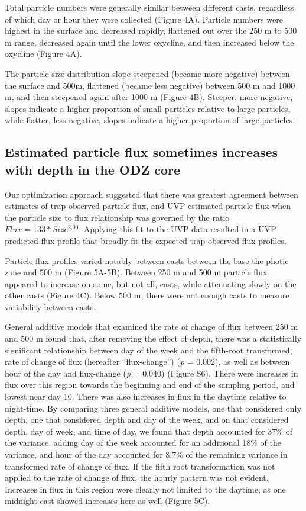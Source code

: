 \documentclass[]{article}
\begin{document}
Total particle numbers were generally similar between different casts,
regardless of which day or hour they were collected (Figure 4A).
Particle numbers were highest in the surface and decreased rapidly,
flattened out over the 250 m to 500 m range, decreased again until the
lower oxycline, and then increased below the oxycline (Figure 4A).

The particle size distribution slope steepened (became more negative)
between the surface and 500m, flattened (became less negative) between
500 m and 1000 m, and then steepened again after 1000 m (Figure 4B).
Steeper, more negative, slopes indicate a higher proportion of small
particles relative to large particles, while flatter, less negative,
slopes indicate a higher proportion of large particles.

\hypertarget{estimated-particle-flux-sometimes-increases-with-depth-in-the-odz-core}{%
\subsection{Estimated particle flux sometimes increases with depth in
the ODZ
core}\label{estimated-particle-flux-sometimes-increases-with-depth-in-the-odz-core}}

Our optimization approach suggested that there was greatest agreement
between estimates of trap observed particle flux, and UVP estimated
particle flux when the particle size to flux relationship was governed
by the ratio \(Flux = 133 * Size ^ {2.00}\). Applying this fit to the
UVP data resulted in a UVP predicted flux profile that broadly fit the
expected trap observed flux profiles.

Particle flux profiles varied notably between casts between the base the
photic zone and 500 m (Figure 5A-5B). Between 250 m and 500 m particle
flux appeared to increase on some, but not all, casts, while attenuating
slowly on the other casts (Figure 4C). Below 500 m, there were not
enough casts to measure variability between casts.

General additive models that examined the rate of change of flux between
250 m and 500 m found that, after removing the effect of depth, there
was a statistically significant relationship between day of the week and
the fifth-root transformed, rate of change of flux (hereafter
``flux-change'') (\emph{p} = 0.002), as well as between hour of the day
and flux-change (\emph{p} = 0.040) (Figure S6). There were increases in
flux over this region towards the beginning and end of the sampling
period, and lowest near day 10. There was also increases in flux in the
daytime relative to night-time. By comparing three general additive
models, one that considered only depth, one that considered depth and
day of the week, and on that considered depth, day of week, and time of
day, we found that depth accounted for 37\% of the variance, adding day
of the week accounted for an additional 18\% of the variance, and hour
of the day accounted for 8.7\% of the remaining variance in transformed
rate of change of flux. If the fifth root transformation was not applied
to the rate of change of flux, the hourly pattern was not evident.
Increases in flux in this region were clearly not limited to the
daytime, as one midnight cast showed increases here as well (Figure 5C).
\end{document}
